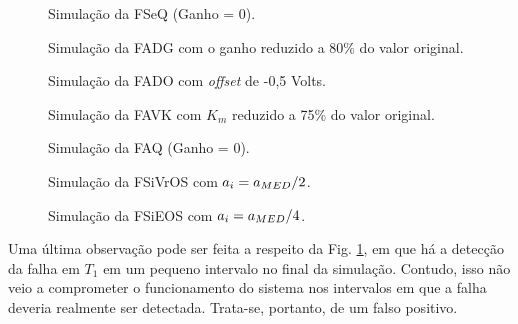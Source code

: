 \begin{figure}[htb]
\footnotesize
\centering

\vspace{1cm}
\caption{Simulação da FSeQ (Ganho = 0).}
\label{fig:fseq}
\end{figure}

\begin{figure}[htb]
\footnotesize
\centering

\vspace{1cm}
\caption{Simulação da FADG com o ganho reduzido a 80\% do valor original.}
\label{fig:fadg}
\end{figure}

\begin{figure}[htb]
\footnotesize
\centering

\vspace{1cm}
\caption{Simulação da FADO com {\it offset} de -0,5 Volts.}
\label{fig:fado}
\end{figure}

\begin{figure}[htb]
\footnotesize
\centering

\vspace{1cm}
\caption{Simulação da FAVK com $K_m$ reduzido a 75\% do valor original.}
\label{fig:favk}
\end{figure}

\begin{figure}[htb]
\footnotesize
\centering

\vspace{1cm}
\caption{Simulação da FAQ (Ganho = 0).}
\label{fig:faq}
\end{figure}

\begin{figure}[htb]
\footnotesize
\centering

\vspace{1cm}
\caption{Simulação da FSiVrOS com $a_i = a_{\tiny MED}/2$.}
\label{fig:fsivros}
\end{figure}

\begin{figure}[htb]
\footnotesize
\centering

\vspace{1cm}
\caption{Simulação da FSiEOS com $a_i = a_{\tiny MED}/4$.}
\label{fig:fsieos}
\end{figure}

Uma última observação pode ser feita a respeito da Fig. \ref{fig:fseq}, em que
há a detecção da falha em $T_1$ em um pequeno intervalo no final da simulação.
Contudo, isso não veio a comprometer o funcionamento do sistema nos intervalos
em que a falha deveria realmente ser detectada. Trata-se, portanto, de um falso
positivo.

